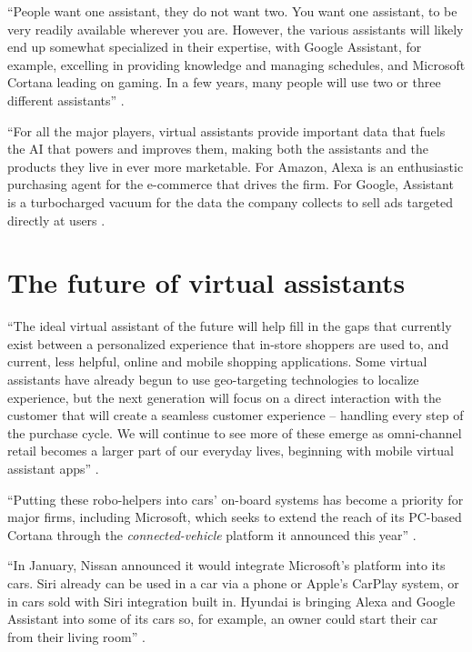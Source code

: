 ``People want one assistant, they do not want two. You want one assistant, to be very readily available wherever you are. However, the various assistants will likely end up somewhat specialized in their expertise, with Google Assistant, for example, excelling in providing knowledge and managing schedules, and Microsoft Cortana leading on gaming. In a few years, many people will use two or three different assistants'' \cite{Baron2017assistants}.

``For all the major players, virtual assistants provide important data that fuels the AI that powers and improves them, making both the assistants and the products they live in ever more marketable. For Amazon, Alexa is an enthusiastic purchasing agent for the e-commerce that drives the firm. For Google, Assistant is a turbocharged vacuum for the data the company collects to sell ads targeted directly at users \cite{Baron2017assistants}.

\section{The future of virtual assistants}

``The ideal virtual assistant of the future will help fill in the gaps that currently exist between a personalized experience that in-store shoppers are used to, and current, less helpful, online and mobile shopping applications. Some virtual assistants have already begun to use geo-targeting technologies to localize experience, but the next generation will focus on a direct interaction with the customer that will create a seamless customer experience – handling every step of the purchase cycle. We will continue to see more of these emerge as omni-channel retail becomes a larger part of our everyday lives, beginning with mobile virtual assistant apps'' \cite{Hard2014applications}.

``Putting these robo-helpers into cars' on-board systems has become a priority for major firms, including Microsoft, which seeks to extend the reach of its PC-based Cortana through the {\em connected-vehicle} platform it announced this year'' \cite{Baron2017assistants}.

``In January, Nissan announced it would integrate Microsoft's platform into its cars. Siri already can be used in a car via a phone or Apple's CarPlay system, or in cars sold with Siri integration built in. Hyundai is bringing Alexa and Google Assistant into some of its cars so, for example, an owner could start their car from their living room'' \cite{Baron2017assistants}.

